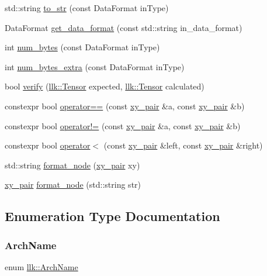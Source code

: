 \begin{DoxyCompactItemize}
std\+::string \hyperlink{namespacellk_a7477ba6804f7b1d71805930f84bfe85f}{to\+\_\+str} (const Data\+Format in\+Type)
\item 
Data\+Format \hyperlink{namespacellk_a4d05986053a0ef31039cf648d9b673f9}{get\+\_\+data\+\_\+format} (const std\+::string in\+\_\+data\+\_\+format)
\item 
int \hyperlink{namespacellk_aede7298fde3871110bbe72268aeac557}{num\+\_\+bytes} (const Data\+Format in\+Type)
\item 
int \hyperlink{namespacellk_ad38ed2c0bc96eb57b9141ec67ae3988a}{num\+\_\+bytes\+\_\+extra} (const Data\+Format in\+Type)
\item 
bool \hyperlink{namespacellk_a4177b29d9834c7885389009539d644d5}{verify} (\hyperlink{classllk_1_1Tensor}{llk\+::\+Tensor} expected, \hyperlink{classllk_1_1Tensor}{llk\+::\+Tensor} calculated)
\item 
constexpr bool \hyperlink{namespacellk_af1f5667d80a5b9802c82d0b618ae6c84}{operator==} (const \hyperlink{structllk_1_1xy__pair}{xy\+\_\+pair} \&a, const \hyperlink{structllk_1_1xy__pair}{xy\+\_\+pair} \&b)
\item 
constexpr bool \hyperlink{namespacellk_a9bf058100a0317833cd763f8f2e74fbf}{operator!=} (const \hyperlink{structllk_1_1xy__pair}{xy\+\_\+pair} \&a, const \hyperlink{structllk_1_1xy__pair}{xy\+\_\+pair} \&b)
\item 
constexpr bool \hyperlink{namespacellk_a23565b6066cff81531570244007bdbd3}{operator$<$} (const \hyperlink{structllk_1_1xy__pair}{xy\+\_\+pair} \&left, const \hyperlink{structllk_1_1xy__pair}{xy\+\_\+pair} \&right)
\item 
std\+::string \hyperlink{namespacellk_acc9374b9eb2016cc65e6efd3300a9480}{format\+\_\+node} (\hyperlink{structllk_1_1xy__pair}{xy\+\_\+pair} xy)
\item 
\hyperlink{structllk_1_1xy__pair}{xy\+\_\+pair} \hyperlink{namespacellk_aa3ef0c59d3d30e3643a2bab665aa164c}{format\+\_\+node} (std\+::string str)
\end{DoxyCompactItemize}


\subsection{Enumeration Type Documentation}
\mbox{\label{namespacellk_adb2574c7c85c75a2dfaf60853d0863d2}} 
\subsubsection{\texorpdfstring{Arch\+Name}{ARCH}}
{\footnotesize\ttfamily enum \hyperlink{namespacellk_adb2574c7c85c75a2dfaf60853d0863d2}{llk\+::\+Arch\+Name}\hspace{0.3cm}{\ttfamily [strong]}}



